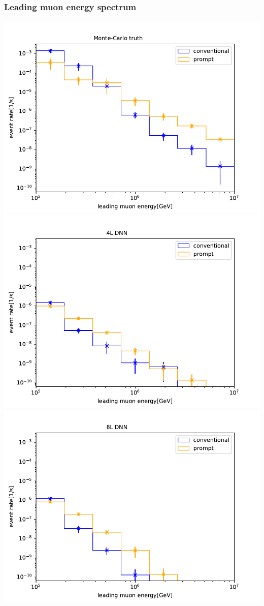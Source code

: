 \documentclass[aspectratio=1610, 9pt]{beamer}
\begin{document}
\begin{frame}
  \frametitle{Leading muon energy spectrum}
  \includegraphics[scale=0.3]{Plots/spectrum_MC_entry.pdf}
  \includegraphics[scale=0.3]{Plots/spectrum_4L_entry.pdf}
  \includegraphics[scale=0.3]{Plots/spectrum_8L_entry.pdf}

\end{frame}
\end{document}
